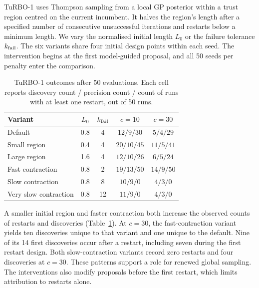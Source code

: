 TuRBO-1 uses Thompson sampling from a local GP posterior within a trust region centred on the current incumbent. It halves the region's length after a specified number of consecutive unsuccessful iterations and restarts below a minimum length. We vary the normalised initial length \(L_0\) or the failure tolerance \(k_{\rm fail}\). The six variants share four initial design points within each seed. The intervention begins at the first model-guided proposal, and all 50 seeds per penalty enter the comparison.

\begin{table}[!htbp]
 \centering
 \caption{TuRBO-1 outcomes after 50 evaluations. Each cell reports discovery count / precision count / count of runs with at least one restart, out of 50 runs.}
 \label{tab:turbo}
 \begin{tabular}{lcccc}
 \toprule
 Variant & \(L_0\) & \(k_{\rm fail}\) & \(c=10\) & \(c=30\)\\
 \midrule
 Default               & 0.8 & 4  & \(12/9/30\)  & \(5/4/29\)\\
 Small region          & 0.4 & 4  & \(20/10/45\) & \(11/5/41\)\\
 Large region          & 1.6 & 4  & \(12/10/26\) & \(6/5/24\)\\
 Fast contraction      & 0.8 & 2  & \(19/13/50\) & \(14/9/50\)\\
 Slow contraction      & 0.8 & 8  & \(10/9/0\)   & \(4/3/0\)\\
 Very slow contraction & 0.8 & 12 & \(11/9/0\)   & \(4/3/0\)\\
 \bottomrule
 \end{tabular}
\end{table}

A smaller initial region and faster contraction both increase the observed counts of restarts and discoveries (Table~\ref{tab:turbo}). At \(c=30\), the fast-contraction variant yields ten discoveries unique to that variant and one unique to the default. Nine of its 14 first discoveries occur after a restart, including seven during the first restart design. Both slow-contraction variants record zero restarts and four discoveries at \(c=30\). These patterns support a role for renewed global sampling. The interventions also modify proposals before the first restart, which limits attribution to restarts alone.